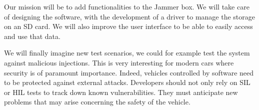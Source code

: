 \hspace{1em}

Our mission will be to add functionalities to the Jammer box. We will take care of designing the software, with the development of a driver to manage the storage on an SD card. We will also improve the user interface to be able to easily access and use that data.

We will finally imagine new test scenarios, we could for example test the system against malicious injections.
This is very interesting for modern cars where security is of paramount importance. Indeed, vehicles controlled by software need to be protected against external attacks.
Developers should not only rely on SIL or HIL tests to track down known vulnerabilities. They must anticipate new problems that may arise concerning the safety of the vehicle.


\newpage

\printbibliography